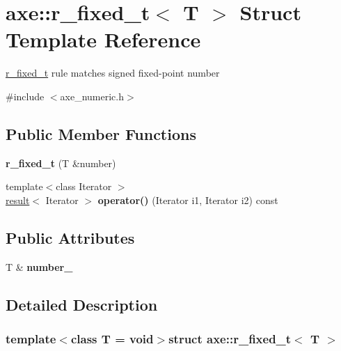 \hypertarget{structaxe_1_1r__fixed__t}{\section{axe\+:\+:r\+\_\+fixed\+\_\+t$<$ T $>$ Struct Template Reference}
\label{structaxe_1_1r__fixed__t}
}


\hyperlink{structaxe_1_1r__fixed__t}{r\+\_\+fixed\+\_\+t} rule matches signed fixed-\/point number  




{\ttfamily \#include $<$axe\+\_\+numeric.\+h$>$}

\subsection*{Public Member Functions}
\begin{DoxyCompactItemize}
\item 
\hypertarget{structaxe_1_1r__fixed__t_a783a9454c1972cef3d3132dcf5dc3b1a}{{\bfseries r\+\_\+fixed\+\_\+t} (T \&number)}\label{structaxe_1_1r__fixed__t_a783a9454c1972cef3d3132dcf5dc3b1a}

\item 
\hypertarget{structaxe_1_1r__fixed__t_a8b4d8239a8975cba4fb5629dd067d64b}{{\footnotesize template$<$class Iterator $>$ }\\\hyperlink{structaxe_1_1result}{result}$<$ Iterator $>$ {\bfseries operator()} (Iterator i1, Iterator i2) const }\label{structaxe_1_1r__fixed__t_a8b4d8239a8975cba4fb5629dd067d64b}

\end{DoxyCompactItemize}
\subsection*{Public Attributes}
\begin{DoxyCompactItemize}
\item 
\hypertarget{structaxe_1_1r__fixed__t_ab63efc4186a426450f89d7af8949e2cb}{T \& {\bfseries number\+\_\+}}\label{structaxe_1_1r__fixed__t_ab63efc4186a426450f89d7af8949e2cb}

\end{DoxyCompactItemize}


\subsection{Detailed Description}
\subsubsection*{template$<$class T = void$>$struct axe\+::r\+\_\+fixed\+\_\+t$<$ T $>$}

